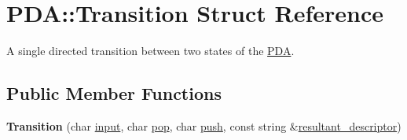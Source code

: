 \hypertarget{structPDA_1_1Transition}{}\section{P\+DA\+:\+:Transition Struct Reference}
\label{structPDA_1_1Transition}


A single directed transition between two states of the \hyperlink{classPDA}{P\+DA}.  


\subsection*{Public Member Functions}
\begin{DoxyCompactItemize}
\item 
{\bfseries Transition} (char \hyperlink{structPDA_1_1Transition_a5bc09abbf91e19148cd5e2ee90260644}{input}, char \hyperlink{structPDA_1_1Transition_a79b0f2480fe10528675ccfbfb43496c8}{pop}, char \hyperlink{structPDA_1_1Transition_a26b034e7feea15822dd0155b4420f677}{push}, const string \&\hyperlink{structPDA_1_1Transition_a6492d2df8ace6be2e84ec84b75d7bce5}{resultant\+\_\+descriptor})\hypertarget{structPDA_1_1Transition_a5ae47e540cafbb2586b3d7935ab058ce}{}\label{structPDA_1_1Transition_a5ae47e540cafbb2586b3d7935ab058ce}

\end{DoxyCompactItemize}

